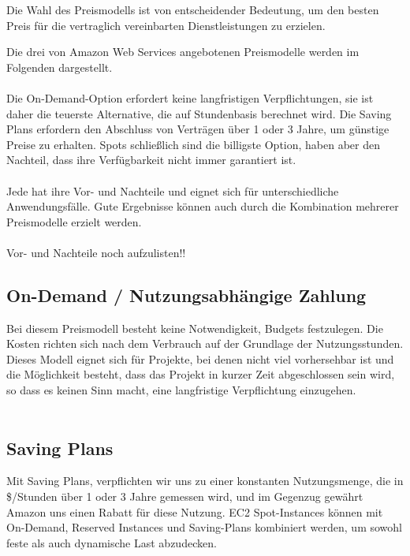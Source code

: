 Die Wahl des Preismodells ist von entscheidender Bedeutung, um den besten Preis für die vertraglich vereinbarten Dienstleistungen zu erzielen. 

Die drei von Amazon Web Services angebotenen Preismodelle werden im Folgenden dargestellt.
\\\\
Die On-Demand-Option erfordert keine langfristigen Verpflichtungen, sie ist daher die teuerste Alternative, die auf Stundenbasis berechnet wird. Die Saving Plans erfordern den Abschluss von Verträgen über 1 oder 3 Jahre, um günstige Preise zu erhalten. Spots schließlich sind die billigste Option, haben aber den Nachteil, dass ihre Verfügbarkeit nicht immer garantiert ist.
\\\\
Jede hat ihre Vor- und Nachteile und eignet sich für unterschiedliche Anwendungsfälle. Gute Ergebnisse können auch durch die Kombination mehrerer Preismodelle erzielt werden.  
\\\\
Vor- und Nachteile noch aufzulisten!!


\subsection{On-Demand / Nutzungsabhängige Zahlung}
Bei diesem Preismodell besteht keine Notwendigkeit, Budgets festzulegen. Die Kosten richten sich nach dem Verbrauch auf der Grundlage der Nutzungsstunden.
\\
Dieses Modell eignet sich für Projekte, bei denen nicht viel vorhersehbar ist und die Möglichkeit besteht, dass das Projekt in kurzer Zeit abgeschlossen sein wird, so dass es keinen Sinn macht, eine langfristige Verpflichtung einzugehen.
\\\\

\subsection{Saving Plans}
Mit Saving Plans, verpflichten wir uns zu einer konstanten Nutzungsmenge, die in \$/Stunden über 1 oder 3 Jahre gemessen wird, und im Gegenzug gewährt Amazon uns einen Rabatt für diese Nutzung.
EC2 Spot-Instances können mit On-Demand, Reserved Instances und Saving-Plans kombiniert werden, um sowohl feste als auch dynamische Last abzudecken.

